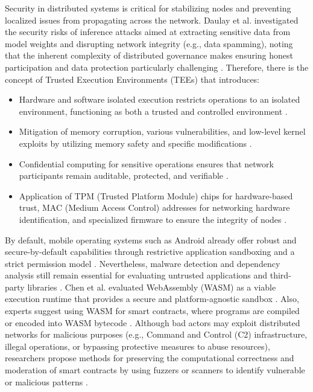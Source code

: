 Security in distributed systems is critical for stabilizing nodes and preventing localized issues from propagating across the network. Daulay et al. investigated the security risks of inference attacks aimed at extracting sensitive data from model weights and disrupting network integrity (e.g., data spamming), noting that the inherent complexity of distributed governance makes ensuring honest participation and data protection particularly challenging \cite{daulay2025novel}. Therefore, there is the concept of Trusted Execution Environments (TEEs) that introduces:
\begin{itemize}
    \item Hardware and software isolated execution restricts operations to an isolated environment, functioning as both a trusted and controlled environment \cite{jauernig2020trusted}.
    \item Mitigation of memory corruption, various vulnerabilities, and low-level kernel exploits by utilizing memory safety and specific modifications \cite{wan2020rustee}.
    \item Confidential computing for sensitive operations ensures that network participants remain auditable, protected, and verifiable \cite{ye2024position}.
    \item Application of TPM (Trusted Platform Module) chips for hardware-based trust, MAC (Medium Access Control) addresses for networking hardware identification, and specialized firmware to ensure the integrity of nodes \cite{bartock2022hardware}.
\end{itemize}

By default, mobile operating systems such as Android already offer robust and secure-by-default capabilities through restrictive application sandboxing and a strict permission model \cite{tuncay2024android}. Nevertheless, malware detection and dependency analysis still remain essential for evaluating untrusted applications and third-party libraries \cite{amro2017malware}. Chen et al. evaluated WebAssembly (WASM) as a viable execution runtime that provides a secure and platform-agnostic sandbox \cite{has2025webassembly}. Also, experts suggest using WASM for smart contracts, where programs are compiled or encoded into WASM bytecode \cite[Ch. 3]{rodriguezsela2025towards}. Although bad actors may exploit distributed networks for malicious purposes (e.g., Command and Control (C2) infrastructure, illegal operations, or bypassing protective measures to abuse resources), researchers propose methods for preserving the computational correctness and moderation of smart contracts by using fuzzers or scanners to identify vulnerable or malicious patterns \cite{chen2022wasai}.
